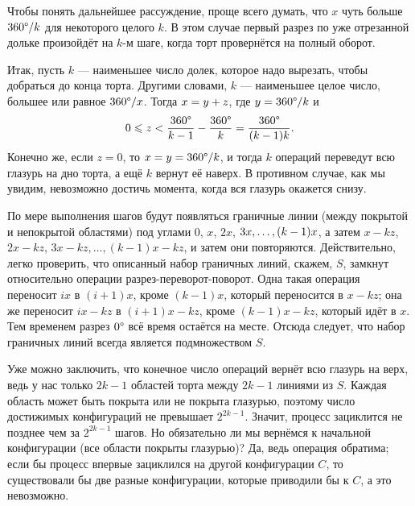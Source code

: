 Чтобы понять дальнейшее рассуждение, проще всего думать, что $x$ чуть больше $360\degree/k$ для некоторого целого $k$.
В этом случае первый разрез по уже отрезанной дольке произойдёт на $k$-м шаге, когда торт провернётся на полный оборот.

Итак, пусть $k$ --- наименьшее число долек, которое надо вырезать, чтобы добраться до конца торта.
Другими словами, $k$ --- наименьшее целое число, большее или равное $360\degree/x$.
Тогда $x \z= y + z$, где $y \z= 360\degree/k$ и 
\[0\leqslant z <\frac{360\degree}{k-1}-\frac{360\degree}{k}=\frac{360\degree}{(k-1)k}.\]
Конечно же, если $z = 0$, то $x = y = 360\degree/k$, и тогда $k$ операций переведут всю глазурь на дно торта, а ещё $k$ вернут её наверх.
В противном случае, как мы увидим, невозможно достичь момента, когда вся глазурь окажется снизу.

По мере выполнения шагов будут появляться граничные линии (между покрытой и непокрытой областями) под углами $0$, $x$, $2x$, $3x, \z\dots , (k - 1)x$, а затем $x - kz$, $2x - kz$, $3x - kz, \dots , (k - 1)x - kz$,
и затем они повторяются.
Действительно, легко проверить, что описанный набор граничных линий, скажем, $S$, замкнут относительно операции разрез-переворот-поворот.
Одна такая операция переносит $ix$ в $(i + 1)x$, кроме $(k - 1)x$, который переносится в $x - kz$;
она же переносит $ix - kz$ в $(i + 1)x - kz$, кроме $(k - 1)x - kz$, который идёт в $x$.
Тем временем разрез $0\degree$ всё время остаётся на месте.
Отсюда следует, что набор граничных линий всегда является подмножеством $S$.

Уже можно заключить, что конечное число операций вернёт всю глазурь на верх, ведь у нас только $2k - 1$ областей торта между $2k - 1$ линиями из $S$.
Каждая область может быть покрыта или не покрыта глазурью, поэтому число достижимых конфигураций не превышает $2^{2k-1}$.
Значит, процесс зациклится не позднее чем за $2^{2k-1}$ шагов.
Но обязательно ли мы вернёмся к начальной конфигурации (все области покрыты глазурью)?
Да, ведь операция обратима;
если бы процесс впервые зациклился на другой конфигурации $C$, то существовали бы две разные конфигурации, которые приводили бы к $C$, а это невозможно.

